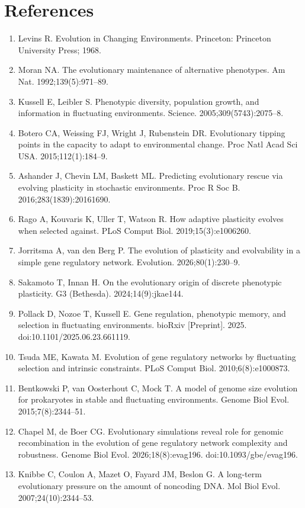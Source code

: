 \section*{References}
\small
\begin{enumerate}\setlength{\itemsep}{1pt}
\item Levins R. Evolution in Changing Environments. Princeton: Princeton University Press; 1968.
\item Moran NA. The evolutionary maintenance of alternative phenotypes. Am Nat. 1992;139(5):971--89.
\item Kussell E, Leibler S. Phenotypic diversity, population growth, and information in fluctuating environments. Science. 2005;309(5743):2075--8.
\item Botero CA, Weissing FJ, Wright J, Rubenstein DR. Evolutionary tipping points in the capacity to adapt to environmental change. Proc Natl Acad Sci USA. 2015;112(1):184--9.
\item Ashander J, Chevin LM, Baskett ML. Predicting evolutionary rescue via evolving plasticity in stochastic environments. Proc R Soc B. 2016;283(1839):20161690.
\item Rago A, Kouvaris K, Uller T, Watson R. How adaptive plasticity evolves when selected against. PLoS Comput Biol. 2019;15(3):e1006260.
\item Jorritsma A, van den Berg P. The evolution of plasticity and evolvability in a simple gene regulatory network. Evolution. 2026;80(1):230--9.
\item Sakamoto T, Innan H. On the evolutionary origin of discrete phenotypic plasticity. G3 (Bethesda). 2024;14(9):jkae144.
\item Pollack D, Nozoe T, Kussell E. Gene regulation, phenotypic memory, and selection in fluctuating environments. bioRxiv [Preprint]. 2025. doi:10.1101/2025.06.23.661119.
\item Tsuda ME, Kawata M. Evolution of gene regulatory networks by fluctuating selection and intrinsic constraints. PLoS Comput Biol. 2010;6(8):e1000873.
\item Bentkowski P, van Oosterhout C, Mock T. A model of genome size evolution for prokaryotes in stable and fluctuating environments. Genome Biol Evol. 2015;7(8):2344--51.
\item Chapel M, de Boer CG. Evolutionary simulations reveal role for genomic recombination in the evolution of gene regulatory network complexity and robustness. Genome Biol Evol. 2026;18(8):evag196. doi:10.1093/gbe/evag196.
\item Knibbe C, Coulon A, Mazet O, Fayard JM, Beslon G. A long-term evolutionary pressure on the amount of noncoding DNA. Mol Biol Evol. 2007;24(10):2344--53.

\end{enumerate}

